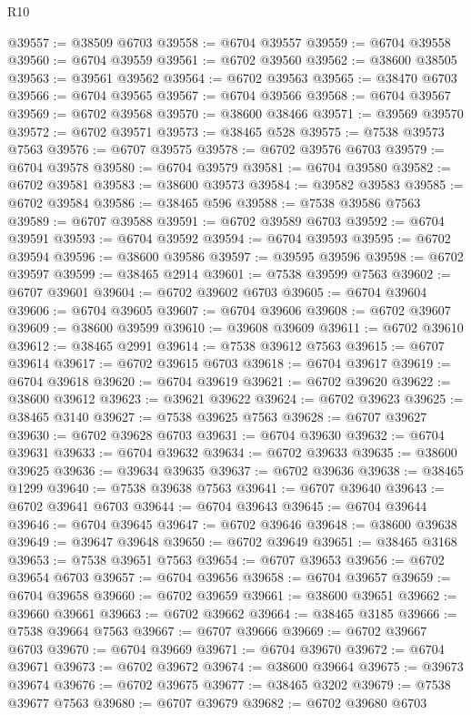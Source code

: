 \begin{lexlean}{R10}
\begin{coremodule}
@39557 := @38509 @6703
@39558 := @6704 @39557
@39559 := @6704 @39558
@39560 := @6704 @39559
@39561 := @6702 @39560
@39562 := @38600 @38505
@39563 := @39561 @39562
@39564 := @6702 @39563
@39565 := @38470 @6703
@39566 := @6704 @39565
@39567 := @6704 @39566
@39568 := @6704 @39567
@39569 := @6702 @39568
@39570 := @38600 @38466
@39571 := @39569 @39570
@39572 := @6702 @39571
@39573 := @38465 @528
@39575 := @7538 @39573 @7563
@39576 := @6707 @39575
@39578 := @6702 @39576 @6703
@39579 := @6704 @39578
@39580 := @6704 @39579
@39581 := @6704 @39580
@39582 := @6702 @39581
@39583 := @38600 @39573
@39584 := @39582 @39583
@39585 := @6702 @39584
@39586 := @38465 @596
@39588 := @7538 @39586 @7563
@39589 := @6707 @39588
@39591 := @6702 @39589 @6703
@39592 := @6704 @39591
@39593 := @6704 @39592
@39594 := @6704 @39593
@39595 := @6702 @39594
@39596 := @38600 @39586
@39597 := @39595 @39596
@39598 := @6702 @39597
@39599 := @38465 @2914
@39601 := @7538 @39599 @7563
@39602 := @6707 @39601
@39604 := @6702 @39602 @6703
@39605 := @6704 @39604
@39606 := @6704 @39605
@39607 := @6704 @39606
@39608 := @6702 @39607
@39609 := @38600 @39599
@39610 := @39608 @39609
@39611 := @6702 @39610
@39612 := @38465 @2991
@39614 := @7538 @39612 @7563
@39615 := @6707 @39614
@39617 := @6702 @39615 @6703
@39618 := @6704 @39617
@39619 := @6704 @39618
@39620 := @6704 @39619
@39621 := @6702 @39620
@39622 := @38600 @39612
@39623 := @39621 @39622
@39624 := @6702 @39623
@39625 := @38465 @3140
@39627 := @7538 @39625 @7563
@39628 := @6707 @39627
@39630 := @6702 @39628 @6703
@39631 := @6704 @39630
@39632 := @6704 @39631
@39633 := @6704 @39632
@39634 := @6702 @39633
@39635 := @38600 @39625
@39636 := @39634 @39635
@39637 := @6702 @39636
@39638 := @38465 @1299
@39640 := @7538 @39638 @7563
@39641 := @6707 @39640
@39643 := @6702 @39641 @6703
@39644 := @6704 @39643
@39645 := @6704 @39644
@39646 := @6704 @39645
@39647 := @6702 @39646
@39648 := @38600 @39638
@39649 := @39647 @39648
@39650 := @6702 @39649
@39651 := @38465 @3168
@39653 := @7538 @39651 @7563
@39654 := @6707 @39653
@39656 := @6702 @39654 @6703
@39657 := @6704 @39656
@39658 := @6704 @39657
@39659 := @6704 @39658
@39660 := @6702 @39659
@39661 := @38600 @39651
@39662 := @39660 @39661
@39663 := @6702 @39662
@39664 := @38465 @3185
@39666 := @7538 @39664 @7563
@39667 := @6707 @39666
@39669 := @6702 @39667 @6703
@39670 := @6704 @39669
@39671 := @6704 @39670
@39672 := @6704 @39671
@39673 := @6702 @39672
@39674 := @38600 @39664
@39675 := @39673 @39674
@39676 := @6702 @39675
@39677 := @38465 @3202
@39679 := @7538 @39677 @7563
@39680 := @6707 @39679
@39682 := @6702 @39680 @6703

\end{coremodule}
\end{lexlean}
